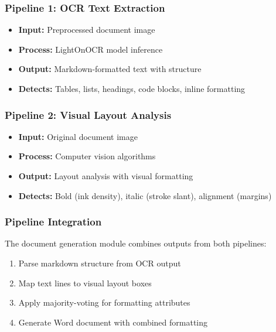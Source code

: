 \documentclass[12pt,a4paper]{article}
\begin{document}
\subsubsection{Pipeline 1: OCR Text Extraction}
\begin{itemize}[noitemsep]
    \item \textbf{Input:} Preprocessed document image
    \item \textbf{Process:} LightOnOCR model inference
    \item \textbf{Output:} Markdown-formatted text with structure
    \item \textbf{Detects:} Tables, lists, headings, code blocks, inline formatting
\end{itemize}

\subsubsection{Pipeline 2: Visual Layout Analysis}
\begin{itemize}[noitemsep]
    \item \textbf{Input:} Original document image
    \item \textbf{Process:} Computer vision algorithms
    \item \textbf{Output:} Layout analysis with visual formatting
    \item \textbf{Detects:} Bold (ink density), italic (stroke slant), alignment (margins)
\end{itemize}

\subsubsection{Pipeline Integration}
The document generation module combines outputs from both pipelines:
\begin{enumerate}[noitemsep]
    \item Parse markdown structure from OCR output
    \item Map text lines to visual layout boxes
    \item Apply majority-voting for formatting attributes
    \item Generate Word document with combined formatting
\end{enumerate}
\end{document}
